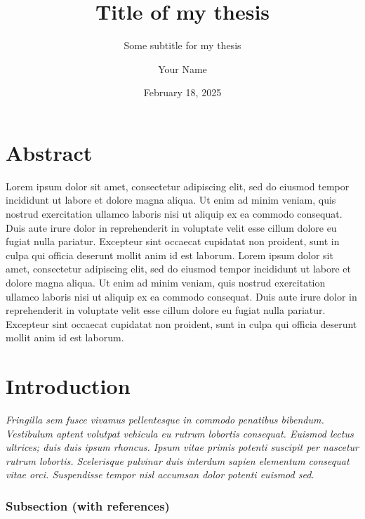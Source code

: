 \documentclass[
  a4paper,
]{scrbook}
\title{Title of my thesis}
\subtitle{Some subtitle for my thesis}
\author{Your Name}
\date{February 18, 2025}
\renewcommand*\contentsname{Table of contents}
\newcommand\contentsname{Table of contents}
\begin{document}
\frontmatter
\maketitle

\renewcommand*\contentsname{Table of contents}
{
\setcounter{tocdepth}{1}
\tableofcontents
}

\mainmatter
\chapter{Abstract}\label{abstract}

Lorem ipsum dolor sit amet, consectetur adipiscing elit, sed do eiusmod
tempor incididunt ut labore et dolore magna aliqua. Ut enim ad minim
veniam, quis nostrud exercitation ullamco laboris nisi ut aliquip ex ea
commodo consequat. Duis aute irure dolor in reprehenderit in voluptate
velit esse cillum dolore eu fugiat nulla pariatur. Excepteur sint
occaecat cupidatat non proident, sunt in culpa qui officia deserunt
mollit anim id est laborum. Lorem ipsum dolor sit amet, consectetur
adipiscing elit, sed do eiusmod tempor incididunt ut labore et dolore
magna aliqua. Ut enim ad minim veniam, quis nostrud exercitation ullamco
laboris nisi ut aliquip ex ea commodo consequat. Duis aute irure dolor
in reprehenderit in voluptate velit esse cillum dolore eu fugiat nulla
pariatur. Excepteur sint occaecat cupidatat non proident, sunt in culpa
qui officia deserunt mollit anim id est laborum.

\chapter{Introduction}\label{introduction}

\emph{Fringilla sem fusce vivamus pellentesque in commodo penatibus
bibendum. Vestibulum aptent volutpat vehicula eu rutrum lobortis
consequat. Euismod lectus ultrices; duis duis ipsum rhoncus. Ipsum vitae
primis potenti suscipit per nascetur rutrum lobortis. Scelerisque
pulvinar duis interdum sapien elementum consequat vitae orci.
Suspendisse tempor nisl accumsan dolor potenti euismod sed.}

\subsection{Subsection (with
references)}\label{subsection-with-references}
\end{document}

